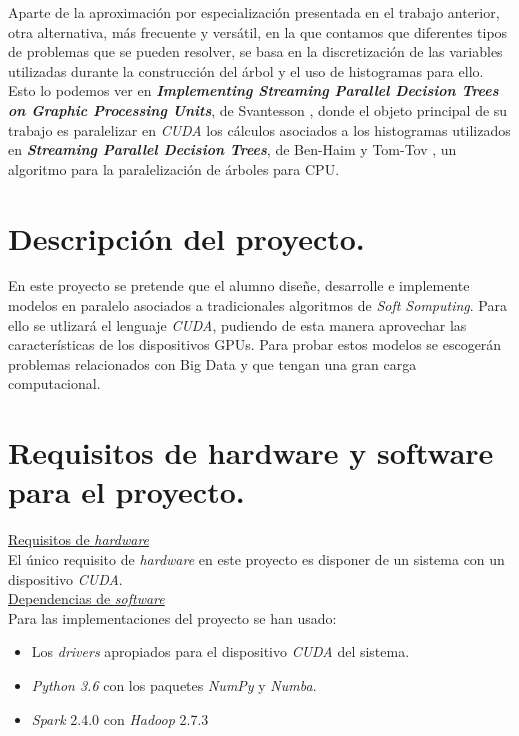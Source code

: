 \documentclass[a4paper,oneside,11pt,titlepage]{book}
\begin{document}
Aparte de la aproximación por especialización presentada en el trabajo anterior, otra alternativa, más frecuente y versátil, en la que contamos que diferentes tipos de problemas que se pueden resolver, se basa en la discretización de las variables utilizadas durante la construcción del árbol y el uso de histogramas para ello. Esto lo podemos ver en \textbf{\textit{Implementing Streaming Parallel Decision Trees on Graphic Processing Units}}, de Svantesson \cite{svatensson}, donde el objeto principal de su trabajo es paralelizar en \textit{CUDA} los cálculos asociados a los histogramas utilizados en \textbf{\textit{Streaming Parallel Decision Trees}}, de Ben-Haim y Tom-Tov \cite{spdt}, un algoritmo para la paralelización de árboles para CPU.\\

\section{Descripción del proyecto.}
En este proyecto se pretende que el alumno diseñe, desarrolle e implemente modelos en paralelo asociados a tradicionales algoritmos de \textit{Soft Somputing}. Para ello se utlizará el lenguaje \textit{CUDA}, pudiendo de esta manera aprovechar las características de los dispositivos GPUs. Para probar estos modelos se escogerán problemas relacionados con Big Data y que tengan una gran carga computacional.

\section{Requisitos de hardware y software para el proyecto.}
\underline{Requisitos de \textit{hardware}}\\
El único requisito de \textit{hardware} en este proyecto es disponer de un sistema con un dispositivo \textit{CUDA}. \\

\underline{Dependencias de \textit{software}}\\
Para las implementaciones del proyecto se han usado:
\begin{itemize}
  \item Los \textit{drivers} apropiados para el dispositivo \textit{CUDA} del sistema.
  \item \textit{Python 3.6} con los paquetes \textit{NumPy} y \textit{Numba}.
  \item \textit{Spark} 2.4.0 con \textit{Hadoop} 2.7.3
\end{itemize}
\end{document}
